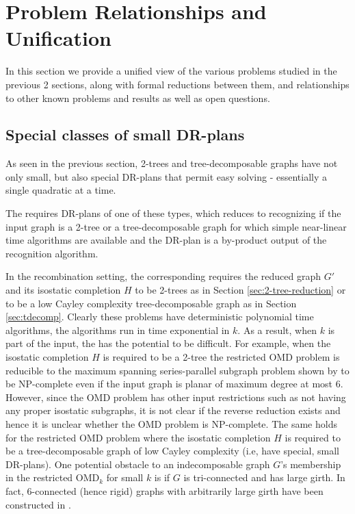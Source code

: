 \section{Problem Relationships and Unification}
\label{sec:table}
In this section we provide a unified view of  the various problems
studied in the previous 2 sections, along with formal reductions
between them, and relationships to other known problems and results as
well as open questions.
%
\subsection{Special classes of small DR-plans}
As seen in the previous section, 2-trees and tree-decomposable graphs
have not only small, but also special DR-plans that permit easy
solving - essentially a single quadratic at a time.

The  requires DR-plans of
one of these types, which reduces to recognizing if the input graph is
a 2-tree or a tree-decomposable graph for which simple near-linear
time algorithms are available \uncited and the DR-plan is a
by-product output of the recognition algorithm.

In the recombination setting, the corresponding  requires the reduced graph $G'$ and its isostatic
completion $H$ to be 2-trees as in Section \ref{sec:2-tree-reduction}
or to be a low Cayley complexity tree-decomposable graph as in Section
\ref{sec:tdecomp}. Clearly these problems have deterministic
polynomial time algorithms, the algorithms run in time exponential in
$k$. As a result, when $k$ is part of the input, the  has the potential to be difficult. For example, when the
isostatic completion $H$ is required to be a 2-tree the restricted OMD
problem is reducible to the maximum spanning series-parallel subgraph
problem shown by \uncited\uncited to be NP-complete even if the input
graph is planar of maximum degree at most 6. However, since the OMD
problem has other input restrictions such as not having any proper
isostatic subgraphs, it is not clear if the reverse reduction exists
and hence it is unclear whether the OMD problem is NP-complete. The
same holds for the restricted OMD problem where the isostatic
completion $H$ is required to be a tree-decomposable graph of low
Cayley complexity (i.e, have special, small DR-plans). One potential
obstacle to an indecomposable graph $G$'s membership in the restricted
OMD$_k$ for small $k$ is if $G$ is tri-connected and has large girth.
In fact, 6-connected (hence rigid) graphs with arbitrarily large girth
have been constructed in \uncited.
%
